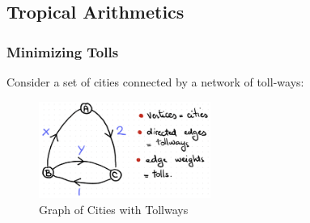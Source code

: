 \documentclass[12pt]{memoir}
\begin{document}
\subsection{Tropical Arithmetics}%

\subsubsection{Minimizing Tolls}

Consider a set of cities connected by a network of toll-ways:
\begin{figure}[h!]
    \centering
    \includegraphics[width=0.5\textwidth]{figs/fig3-1-CityGraphMap.png}
    \caption{Graph of Cities with Tollways}
    \label{fig:3-1-CityGraphMap}
\end{figure}
\end{document}
